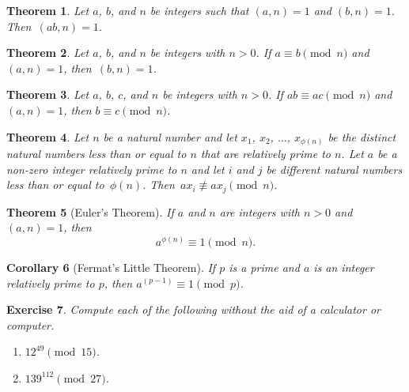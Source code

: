 \documentclass[11pt,leqno]{article}
\newtheorem{thm}{Theorem}[section]
\newtheorem{cor}[thm]{Corollary}
\newtheorem{exer}[thm]{Exercise}
\theoremstyle{definition}
\begin{document}
\begin{thm}
Let $a$, $b$, and $n$ be integers such that $(a, n) = 1$ and $(b, n)
= 1$. Then~\mbox{$(ab, n) = 1$}.
\end{thm}

\begin{thm}
Let $a$, $b$, and $n$ be integers with $n > 0$. If $a \equiv b
\pmod{n}$ and $(a, n) = 1$, then~$(b, n) = 1$.
\end{thm}

\begin{thm}
Let $a$, $b$, $c$, and $n$ be integers with $n
> 0$.  If $ab \equiv ac \pmod{n}$ and $(a, n) = 1$, then $b \equiv c
\pmod{n}$.
\end{thm}

\begin{thm}
Let $n$ be a natural number and let $x_1$, $x_2$, $\hdots$,
$x_{\phi(n)}$ be the distinct natural numbers less than or equal to
$n$ that are relatively prime to $n$.  Let $a$ be a non-zero integer
relatively prime to $n$ and let $i$ and $j$ be different natural
numbers less than or equal to~$\phi(n)$.  Then~$ax_i \not \equiv
ax_j \pmod{n}$.
\end{thm}

\begin{thm}[Euler's Theorem]
If $a$ and $n$ are integers with $n > 0$ and $(a, n) = 1$, then \[
a^{\phi(n)} \equiv 1 \pmod{n}. \]
\end{thm}

\begin{cor}[Fermat's Little Theorem]
If $p$ is a prime and $a$ is an integer relatively prime to $p$,
then $a^{(p-1)} \equiv 1 \pmod{p}$.
\end{cor}


\begin{exer}
Compute each of the following without the aid of a calculator or
computer.
\begin{enumerate}
\item $12^{49} \pmod{15}$.
\item $139^{112} \pmod{27}$.
\end{enumerate}
\end{exer}
\end{document}
